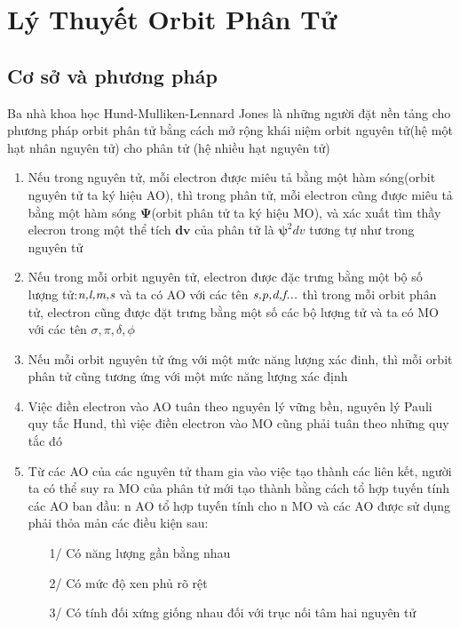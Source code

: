 
\chapter{Lý Thuyết Orbit Phân Tử} %
\label{AppendixA} %

 \section{Cơ sở và phương pháp}
 Ba nhà khoa học Hund-Mulliken-Lennard Jones là những người đặt nền tảng cho phương pháp orbit phân tử bằng cách mở rộng khái niệm orbit nguyên tử(hệ một hạt nhân nguyên tử) cho phân tử (hệ nhiều hạt nguyên tử)
 \begin{enumerate}
 \item Nếu trong nguyên tử, mỗi electron được miêu tả bằng một hàm sóng(orbit nguyên tử ta ký hiệu AO), thì trong phân tử, mỗi electron cũng được miêu tả  bằng một hàm sóng $\boldsymbol{\Psi}$(orbit phân tử ta ký hiệu MO), và xác xuất tìm thầy elecron trong một thể tích $\boldsymbol{dv}$ của phân tử là $\boldsymbol{\psi}^2 dv$ tương tự như trong nguyên tử
 \item Nếu trong mỗi orbit nguyên tử, electron được đặc trưng bằng một bộ số lượng tử:$\emph{n,l,m,s}$ và ta có AO với các tên $\emph{s,p,d,f...}$ thì trong mỗi orbit phân tử, electron cũng được đặt trưng bằng một số các bộ lượng tử  và ta có MO với các tên $\sigma, \pi, \delta,\phi$
 \item Nếu mỗi orbit nguyên tử ứng với một mức năng lượng xác đinh, thì mỗi orbit phân tử cũng tương ứng với một mức năng lượng xác định
 \item Việc điền electron vào AO tuân theo nguyên lý vững bền, nguyên lý Pauli quy tắc Hund, thì việc điền electron vào MO cũng phải tuân theo những quy tắc đó
 \item Từ các AO của các nguyên tử tham gia vào việc tạo thành các liên kết, người ta có thể suy ra MO của phân tử mới tạo thành bằng cách tổ hợp tuyến tính các AO ban đầu: n AO tổ hợp tuyến tính cho n MO và các AO được sử dụng phải thỏa mản các điều kiện sau:
 \begin{itemize}
 \item[1/] Có năng lượng gần bằng nhau
 \item[2/] Có mức độ xen phủ rõ rệt
 \item[3/] Có tính đối xứng giống nhau đối với trục nối tâm hai nguyên tử
 \end{itemize}
\end{enumerate}  
